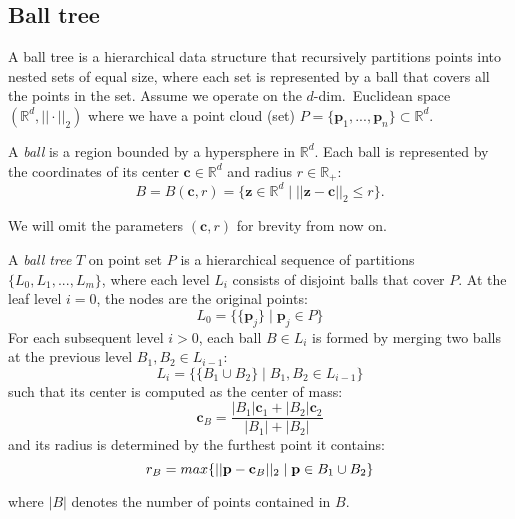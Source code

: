 \subsection{Ball tree}
\label{section:ball_tree}

A ball tree is a hierarchical data structure that recursively partitions points into nested sets of equal size, where each set is represented by a ball that covers all the points in the set. Assume we operate on the $d$-dim.~Euclidean space $\left( \mathbb{R}^d, || \cdot||_2\right)$ where we have a point cloud (set) $P = \{ \mathbf{p}_1, ..., \mathbf{p}_n\} \subset\mathbb{R}^d$. 

\begin{definition}[Ball]
A \emph{ball} is a region bounded by a hypersphere in $\mathbb{R}^d$. Each ball is represented by the coordinates of its center $\mathbf{c} \in \mathbb{R}^d$ and radius $r \in \mathbb{R}_+$:
\begin{equation}
    B = B(\mathbf{c},r) = \{\mathbf{z} \in \mathbb{R}^d \mid ||\mathbf{z} - \mathbf{c}||_2 \leq r \}.
\end{equation}
\end{definition}
\vspace{-5pt}
We will omit the parameters $(\mathbf{c},r)$ for brevity from now on.

\begin{definition}
\label{def:ball_tree}
A \emph{ball tree} $T$ on point set $P$ is a hierarchical sequence of partitions $\{L_0, L_1, ..., L_m\}$, where each level $L_i$ consists of disjoint balls that cover $P$. At the leaf level $i = 0$, the nodes are the original points:
\begin{equation*}
     L_0 = \{ \{\mathbf{p}_j \} \mid \mathbf{p}_j \in P\}
\end{equation*}
For each subsequent level $i > 0$, each ball $B \in L_i$ is formed by merging two balls at the previous level $B_1, B_2 \in L_{i-1}$:
\begin{equation}
    L_i = \{ \{B_1 \cup B_2 \} \mid B_1, B_2 \in L_{i-1} \}
\end{equation}
such that its center is computed as the center of mass:
\begin{equation*}
    \mathbf{c}_B = \frac{|B_1| \mathbf{c}_1 + |B_2| \mathbf{c}_2}{|B_1| + |B_2|}
\end{equation*}
and its radius is determined by the furthest point it contains:
\begin{equation*}
    r_B = max\{ || \mathbf{p} - \mathbf{c}_B ||_2 \mid \mathbf{p} \in B_1 \cup B_2\}
\vspace{-5pt}
\end{equation*}
\end{definition}
where $|B|$ denotes the number of points contained in $B$. 

